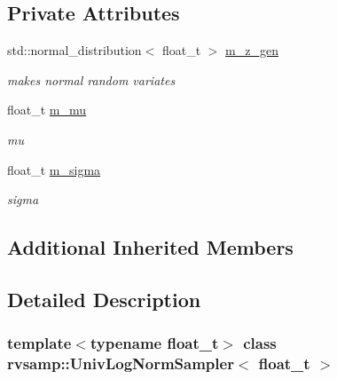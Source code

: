 \subsection*{Private Attributes}
\begin{DoxyCompactItemize}
\item 
\mbox{\label{classrvsamp_1_1UnivLogNormSampler_a2f41b8dd97ef6f0cd5537a2b11242cb6}} 
std\+::normal\+\_\+distribution$<$ float\+\_\+t $>$ \hyperlink{classrvsamp_1_1UnivLogNormSampler_a2f41b8dd97ef6f0cd5537a2b11242cb6}{m\+\_\+z\+\_\+gen}
\begin{DoxyCompactList}\small\item\em makes normal random variates \end{DoxyCompactList}\item 
\mbox{\label{classrvsamp_1_1UnivLogNormSampler_a94599a9ec4d17a1c68f77b5a6cb22a8d}} 
float\+\_\+t \hyperlink{classrvsamp_1_1UnivLogNormSampler_a94599a9ec4d17a1c68f77b5a6cb22a8d}{m\+\_\+mu}
\begin{DoxyCompactList}\small\item\em mu \end{DoxyCompactList}\item 
\mbox{\label{classrvsamp_1_1UnivLogNormSampler_a608a40aa21935aaa36a9c44f1a3392a4}} 
float\+\_\+t \hyperlink{classrvsamp_1_1UnivLogNormSampler_a608a40aa21935aaa36a9c44f1a3392a4}{m\+\_\+sigma}
\begin{DoxyCompactList}\small\item\em sigma \end{DoxyCompactList}\end{DoxyCompactItemize}
\subsection*{Additional Inherited Members}


\subsection{Detailed Description}
\subsubsection*{template$<$typename float\+\_\+t$>$\newline
class rvsamp\+::\+Univ\+Log\+Norm\+Sampler$<$ float\+\_\+t $>$}

